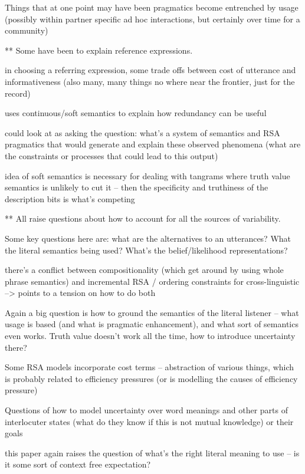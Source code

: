 \documentclass[]{article}
\begin{document}
Things that at one point may have been pragmatics become entrenched by usage (possibly within partner specific ad hoc interactions, but certainly over time for a community) 

** Some have been to explain reference expressions. 

\cite{degen20200406} in choosing a referring expression, some trade offs between cost of utterance and informativeness (also many, many things no where near the frontier, just for the record) 

\cite{degen20200406} uses continuous/soft semantics to explain how redundancy can be useful

could look at \cite{degen20200406} as asking the question: what's a system of semantics and RSA pragmatics that would generate and explain these observed phenomena (what are the constraints or processes that could lead to this output) 

idea of soft semantics is necessary for dealing with tangrams where truth value semantics is unlikely to cut it -- then the specificity and truthiness of the description bits is what's competing 

** All raise questions about how to account for all the sources of variability. 

Some key questions here are: what are the alternatives to an utterances? What the literal semantics being used? What's the belief/likelihood representations? 


there's a conflict between compositionality (which \cite{degen20200406} get around by using whole phrase semantics) and incremental RSA / ordering constraints for cross-linguistic --> points to a tension on how to do both

Again a big question is how to ground the semantics of the literal listener -- what usage is based (and what is pragmatic enhancement), and what sort of semantics even works. Truth value doesn't work all the time, how to introduce uncertainty there? 

Some RSA models incorporate cost terms -- abstraction of various things, which is probably related to efficiency pressures (or is modelling the causes of efficiency pressure) 

Questions of how to model uncertainty over word meanings and other parts of interlocuter states (what do they know if this is not mutual knowledge) or their goals

\cite{goodman2013} this paper again raises the question of what's the right literal meaning to use  -- is it some sort of context free expectation? 
\end{document}
